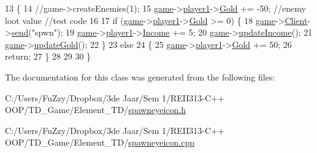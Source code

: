 \begin{DoxyCode}
13 \{
14     \textcolor{comment}{//game->createEnemies(1);}
15     \hyperlink{spawneyeicon_8cpp_a58bdb5643d0814ac4e697a1564b79b70}{game}->\hyperlink{class_game_ad8a7cc146f99c7ec5b7c3c25d73f118c}{player1}->\hyperlink{class_player1_ab390478b345e443398bac442a04b675c}{Gold} += -50;  \textcolor{comment}{//enemy loot value //test code}
16 
17     \textcolor{keywordflow}{if} (\hyperlink{spawneyeicon_8cpp_a58bdb5643d0814ac4e697a1564b79b70}{game}->\hyperlink{class_game_ad8a7cc146f99c7ec5b7c3c25d73f118c}{player1}->\hyperlink{class_player1_ab390478b345e443398bac442a04b675c}{Gold} >= 0) \{
18         \hyperlink{spawneyeicon_8cpp_a58bdb5643d0814ac4e697a1564b79b70}{game}->\hyperlink{class_game_aa7fd8508fad68c550129f2be61c37467}{Client}->\hyperlink{class_u_d_p_socket_a66a6c4663cc3084cb4d76583e8039083}{send}(\textcolor{stringliteral}{"spwn"});
19         \hyperlink{spawneyeicon_8cpp_a58bdb5643d0814ac4e697a1564b79b70}{game}->\hyperlink{class_game_ad8a7cc146f99c7ec5b7c3c25d73f118c}{player1}->\hyperlink{class_player1_a414fae948c79246f6a98554718f0cd99}{Income} += 5;
20         \hyperlink{spawneyeicon_8cpp_a58bdb5643d0814ac4e697a1564b79b70}{game}->\hyperlink{class_game_a5a6924497d779286af09f339d4c7a598}{updateIncome}();
21         \hyperlink{spawneyeicon_8cpp_a58bdb5643d0814ac4e697a1564b79b70}{game}->\hyperlink{class_game_a065998f7609f63e2987ede928359595a}{updateGold}();
22     \}
23     \textcolor{keywordflow}{else}
24     \{
25         \hyperlink{spawneyeicon_8cpp_a58bdb5643d0814ac4e697a1564b79b70}{game}->\hyperlink{class_game_ad8a7cc146f99c7ec5b7c3c25d73f118c}{player1}->\hyperlink{class_player1_ab390478b345e443398bac442a04b675c}{Gold} += 50;
26         \textcolor{keywordflow}{return};
27     \}
28 
29 
30 \}
\end{DoxyCode}


The documentation for this class was generated from the following files\+:\begin{DoxyCompactItemize}
\item 
C\+:/\+Users/\+Fu\+Zzy/\+Dropbox/3de Jaar/\+Sem 1/\+R\+E\+I\+I313-\/\+C++ O\+O\+P/\+T\+D\+\_\+\+Game/\+Element\+\_\+\+T\+D/\hyperlink{spawneyeicon_8h}{spawneyeicon.\+h}\item 
C\+:/\+Users/\+Fu\+Zzy/\+Dropbox/3de Jaar/\+Sem 1/\+R\+E\+I\+I313-\/\+C++ O\+O\+P/\+T\+D\+\_\+\+Game/\+Element\+\_\+\+T\+D/\hyperlink{spawneyeicon_8cpp}{spawneyeicon.\+cpp}\end{DoxyCompactItemize}
